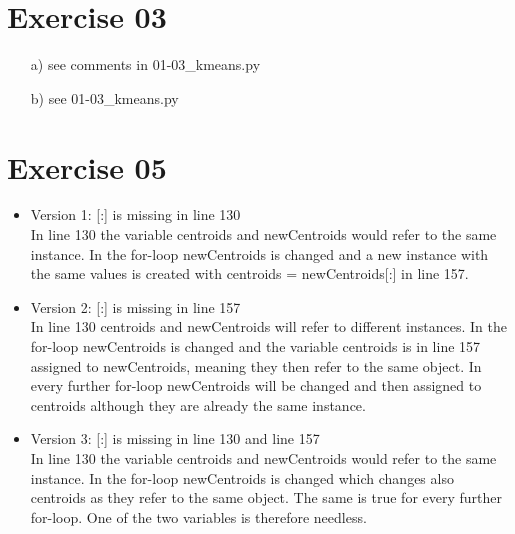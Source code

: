 \documentclass[11pt,a4paper]{scrartcl}
\begin{document}
\section*{Exercise 03}
	\begin{itemize}
		\item [a)] see comments in 01-03_kmeans.py
		\item[b)] see 01-03_kmeans.py
	\end{itemize}

\section*{Exercise 05}
	\begin{itemize}
		\item Version 1: [:] is missing in line 130 \\
    In line 130 the variable centroids and newCentroids would refer to the same instance. In the for-loop newCentroids is changed and a new instance with the same values is created with centroids = newCentroids[:] in line 157.
		\item Version 2: [:] is missing in line 157 \\
    In line 130 centroids and newCentroids will refer to different instances. In the for-loop newCentroids is changed and the variable centroids is in line 157 assigned to newCentroids, meaning they then refer to the same object. In every further for-loop newCentroids will be changed and then assigned to centroids although they are already the same instance.
		\item Version 3: [:] is missing in line 130 and line 157 \\
    In line 130 the variable centroids and newCentroids would refer to the same instance. In the for-loop newCentroids is changed which changes also centroids as they refer to the same object. The same is true for every further for-loop. One of the two variables is therefore needless.
	\end{itemize}
\end{document}
